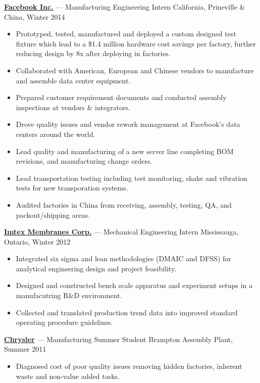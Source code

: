\documentclass[pdftex,11pt,letterpaper]{article}
\begin{document}
\href{http://facebook.com}{\textbf{Facebook Inc.}} --- Manufacturing Engineering Intern \hfill {\color{gray} California, Prineville \& China, Winter 2014}
\begin{itemize}

\item Prototyped, tested, manufactured and deployed a custom designed test fixture which lead to a \$1.4 million hardware cost savings per factory, further reducing design by 8x after deploying in factories.
\item Collaborated with American, European and Chinese vendors to manufacture and assemble data center equipment.
\item Prepared customer requirement documents and conducted assembly inspections at vendors \& integrators.
\item Drove quality issues and vendor rework management at Facebook's data centers around the world.
\item Lead quality and manufacturing of a new server line completing BOM revisions, and manufacturing change orders.
\item Lead transportation testing including test monitoring, shake and vibration tests for new transporation systems.
\item Audited factories in China from receiving, assembly, testing, QA, and packout/shipping areas.
\end{itemize}

\href{http://www.imtexmembranes.com/}{\textbf{Imtex Membranes Corp.}} --- Mechanical Engineering Intern \hfill {\color{gray} Mississauga, Ontario, Winter 2012}
\begin{itemize}
\item Integrated six sigma and lean methodologies (DMAIC and DFSS) for analytical engineering design and project feasibility.
\item Designed and constructed bench scale apparatus and experiment setups in a manufacutring R\&D environment.
\item Collected and translated production trend data into improved standard operating procedure guidelines.

\end{itemize}

\href{http://chrysler.ca}{\textbf{Chrysler}} --- Manufacturing Summer Student \hfill {\color{gray} Brampton Assembly Plant, Summer 2011}
\begin{itemize}
\item Diagnosed cost of poor quality issues removing hidden factories, inherent waste and non-value added tasks.
\end{itemize}
\end{document}
